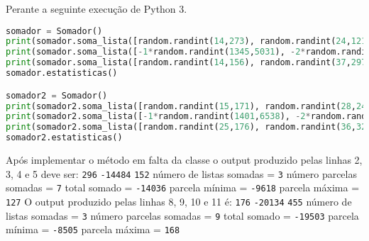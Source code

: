 \documentclass[37pt,varwidth=16cm,border=17pt]{standalone}
\begin{document}
Perante a seguinte execução de Python 3. 

\begin{lstlisting}[language=Python]
somador = Somador()
print(somador.soma_lista([random.randint(14,273), random.randint(24,121), random.randint(24,140)]))
print(somador.soma_lista([-1*random.randint(1345,5031), -2*random.randint(1189, 6392)]))
print(somador.soma_lista([random.randint(14,156), random.randint(37,297)]))
somador.estatisticas()

somador2 = Somador()
print(somador2.soma_lista([random.randint(15,171), random.randint(28,248)]))
print(somador2.soma_lista([-1*random.randint(1401,6538), -2*random.randint(1691, 5503), -3*random.randint(1283,7453)]))
print(somador2.soma_lista([random.randint(25,176), random.randint(36,329), random.randint(7,159), random.randint(5,313)]))
somador2.estatisticas()
\end{lstlisting}



Após implementar o método em falta da classe o output produzido pelas linhas 2, 3, 4 e 5 deve ser:
\newline 
\verb+296+\newline
\verb+-14484+\newline
\verb+152+\newline
número de listas somadas = \verb+3+\newline
número parcelas somadas  = \verb+7+\newline
total somado             = \verb+-14036+\newline
parcela mínima           = \verb+-9618+\newline
parcela máxima           = \verb+127+\newline
\newline
\newline
O output produzido pelas linhas 8, 9, 10 e 11 é:
\newline
\verb+176+\newline
\verb+-20134+\newline
\verb+455+\newline
número de listas somadas = \verb+3+\newline
número parcelas somadas  = \verb+9+\newline
total somado             = \verb+-19503+\newline
parcela mínima           = \verb+-8505+\newline
parcela máxima           = \verb+168+\newline
\end{document}

